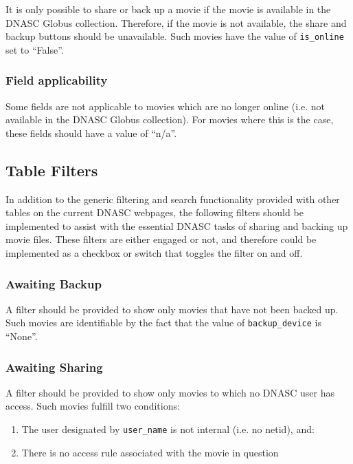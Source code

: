 It is only possible to share or back up a movie if the movie is available in the DNASC Globus
collection. Therefore, if the movie is not available, the share and backup buttons should be
unavailable. Such movies have the value of \texttt{is\_online} set to ``False''.

\subsubsection{Field applicability}

Some fields are not applicable to movies which are no longer online (i.e. not available in the
DNASC Globus collection). For movies where this is the case, these fields should have a value
of ``n/a''.

\subsection{Table Filters}

In addition to the generic filtering and search functionality provided with other tables on the
current DNASC webpages, the following filters should be implemented to assist with the essential 
DNASC tasks of sharing and backing up movie files. These filters are either engaged or not, and 
therefore could be implemented as a checkbox or switch that toggles the filter on and off.

\subsubsection{Awaiting Backup}

A filter should be provided to show only movies that have not been backed up.
Such movies are identifiable by the fact that the value of \texttt{backup\_device} is ``None''. 

\subsubsection{Awaiting Sharing}

A filter should be provided to show only movies to which no DNASC user has access. Such movies 
fulfill two conditions:
\begin{enumerate}\itemsep1pt
    \item The user designated by \texttt{user\_name} is not internal (i.e. no netid), and:
    \item There is no access rule associated with the movie in question
\end{enumerate}
